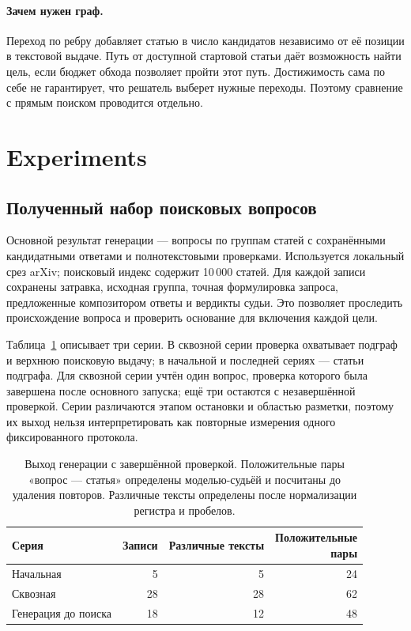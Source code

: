 \paragraph{Зачем нужен граф.}
Переход по ребру добавляет статью в число кандидатов независимо от её позиции в текстовой выдаче. Путь от доступной стартовой статьи даёт возможность найти цель, если бюджет обхода позволяет пройти этот путь. Достижимость сама по себе не гарантирует, что решатель выберет нужные переходы. Поэтому сравнение с прямым поиском проводится отдельно.

\section{Experiments}\label{sec:exp}

\subsection{Полученный набор поисковых вопросов}\label{sec:generated}

Основной результат генерации --- вопросы по группам статей с сохранёнными кандидатными ответами и полнотекстовыми проверками. Используется локальный срез arXiv; поисковый индекс содержит 10\,000 статей. Для каждой записи сохранены затравка, исходная группа, точная формулировка запроса, предложенные композитором ответы и вердикты судьи. Это позволяет проследить происхождение вопроса и проверить основание для включения каждой цели.

Таблица~\ref{tab:generated-questions} описывает три серии. В сквозной серии проверка охватывает подграф и верхнюю поисковую выдачу; в начальной и последней сериях --- статьи подграфа. Для сквозной серии учтён один вопрос, проверка которого была завершена после основного запуска; ещё три остаются с незавершённой проверкой. Серии различаются этапом остановки и областью разметки, поэтому их выход нельзя интерпретировать как повторные измерения одного фиксированного протокола.

\begin{table}[t]
\centering
\caption{Выход генерации с завершённой проверкой. Положительные пары «вопрос --- статья» определены моделью-судьёй и посчитаны до удаления повторов. Различные тексты определены после нормализации регистра и пробелов.}
\label{tab:generated-questions}
\small
\begin{tabular}{lrrr}
\toprule
Серия & Записи & Различные тексты & \shortstack{Положительные\\пары} \\
\midrule
Начальная & 5 & 5 & 24 \\
Сквозная & 28 & 28 & 62 \\
Генерация до поиска & 18 & 12 & 48 \\
\bottomrule
\end{tabular}
\end{table}

